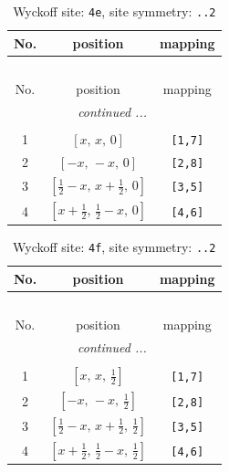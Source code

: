 \documentclass[fleqn,8pt]{jsarticle}
\begin{document}
\begin{longtable}{ccc}
\caption{Wyckoff site: {\tt 4e}, site symmetry: {\tt ..2}}
 \\
 \hline \hline
No. & position & mapping \\ \hline \endfirsthead

\multicolumn{2}{l}{\tablename\ \thetable{}} \\
 \hline \hline
No. & position & mapping \\ \hline \endhead

 \hline \hline
\multicolumn{2}{r}{\footnotesize\it continued ...} \\ \endfoot

 \hline \hline
\multicolumn{2}{r}{} \\ \endlastfoot

1 & $\left[ x,\, x,\, 0 \right]$ & {\tt [1,7]} \\ \hline
2 & $\left[ - x,\, - x,\, 0 \right]$ & {\tt [2,8]} \\ \hline
3 & $\left[ \frac{1}{2} - x,\, x + \frac{1}{2},\, 0 \right]$ & {\tt [3,5]} \\ \hline
4 & $\left[ x + \frac{1}{2},\, \frac{1}{2} - x,\, 0 \right]$ & {\tt [4,6]} \\
\end{longtable}
\renewcommand{\arraystretch}{1.2}
\begin{longtable}{ccc}
\caption{Wyckoff site: {\tt 4f}, site symmetry: {\tt ..2}}
 \\
 \hline \hline
No. & position & mapping \\ \hline \endfirsthead

\multicolumn{2}{l}{\tablename\ \thetable{}} \\
 \hline \hline
No. & position & mapping \\ \hline \endhead

 \hline \hline
\multicolumn{2}{r}{\footnotesize\it continued ...} \\ \endfoot

 \hline \hline
\multicolumn{2}{r}{} \\ \endlastfoot

1 & $\left[ x,\, x,\, \frac{1}{2} \right]$ & {\tt [1,7]} \\ \hline
2 & $\left[ - x,\, - x,\, \frac{1}{2} \right]$ & {\tt [2,8]} \\ \hline
3 & $\left[ \frac{1}{2} - x,\, x + \frac{1}{2},\, \frac{1}{2} \right]$ & {\tt [3,5]} \\ \hline
4 & $\left[ x + \frac{1}{2},\, \frac{1}{2} - x,\, \frac{1}{2} \right]$ & {\tt [4,6]} \\
\end{longtable}
\end{document}
